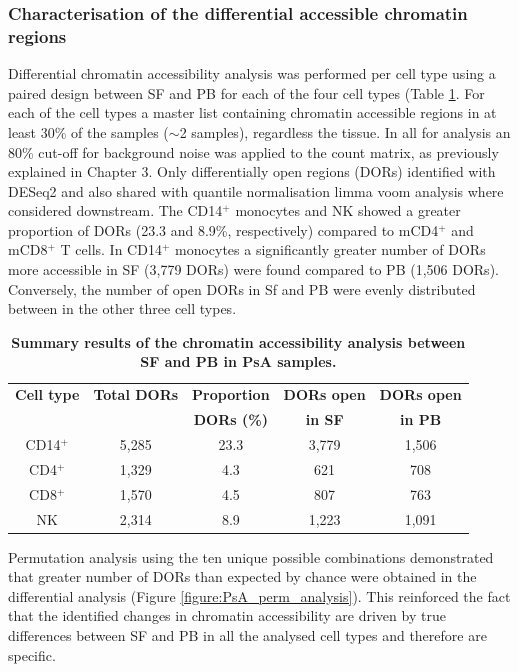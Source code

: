 \subsubsection{Characterisation of the differential accessible chromatin regions}
Differential chromatin accessibility analysis was performed per cell type using a paired design between SF and PB for each of the four cell types (Table \ref{tab:PSA_DOCs_results}. For each of the cell types a master list containing chromatin accessible regions in at least 30\% of the samples ($\sim$2 samples), regardless the tissue. In all for analysis an 80\% cut-off for background noise was applied to the count matrix, as previously explained in Chapter 3. Only differentially open regions (DORs) identified with DESeq2 and also shared with quantile normalisation limma voom analysis where considered downstream. The CD14$^+$ monocytes and NK showed a greater proportion of DORs (23.3 and 8.9\%, respectively) compared to mCD4$^+$ and mCD8$^+$ T cells. In CD14$^+$ monocytes a significantly greater number of DORs more accessible  in SF (3,779 DORs) were found compared to PB (1,506 DORs). Conversely, the number of open DORs in Sf and PB were evenly distributed between in the other three cell types.


\begin{table}[htbp]
\centering
\begin{tabular}{@{}c c c c c}
\toprule
\textbf{Cell type}  & \textbf{Total DORs} &  \textbf{Proportion}  & \textbf{DORs open} & \textbf{DORs open} \\
                    &                     &  \textbf{DORs (\%)}  & \textbf{in SF} & \textbf{in PB} \\
\midrule
\midrule
CD14$^+$ & 5,285 & 23.3 & 3,779 & 1,506 \\
CD4$^+$  & 1,329 & 4.3 & 621 & 708 \\
CD8$^+$  & 1,570 & 4.5 & 807 & 763 \\
NK       & 2,314 & 8.9 & 1,223 & 1,091 \\
\bottomrule
\end{tabular}
\medskip %
\caption[Summary results of the chromatin accessibility analysis between SF and PB in PsA samples]{\textbf{Summary results of the chromatin accessibility analysis between SF and PB in PsA samples.}}
\label{tab:PSA_DOCs_results}
\end{table}

Permutation analysis using the ten unique possible combinations demonstrated that greater number of DORs than expected by chance were obtained in the differential analysis (Figure \ref{figure:PsA_perm_analysis}). This reinforced the fact that the identified changes in chromatin accessibility are driven by true differences between SF and PB in all the analysed cell types and therefore are specific.
  
